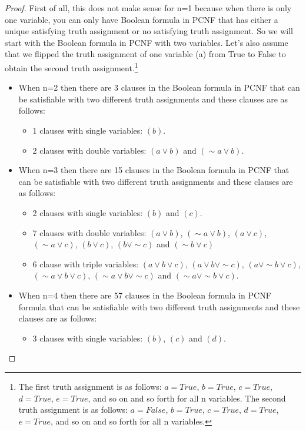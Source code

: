 \documentclass[runningheads,a4paper]{llncs}
\let\oldsim\sim
\renewcommand{\sim}{{\oldsim}}
\begin{document}
\begin{theorem}
\begin{proof}
First of all, this does not make sense for n=1 because when there is only one variable, you can only have Boolean formula in PCNF that has either a unique satisfying truth assignment or no satisfying truth assignment. So we will start with the Boolean formula in PCNF with two variables. Let's also assume that we flipped the truth assignment of one variable (a) from True to False to obtain the second truth assignment.\footnote{The first truth assignment is as follows: $a=True$, $b=True$, $c=True$, $d=True$, $e=True$, and so on and so forth for all n variables. The second truth assignment is as follows: $a=False$, $b=True$, $c=True$, $d=True$, $e=True$, and so on and so forth for all n variables. } 
\begin{itemize}
\item When n=2 then there are 3 clauses in the Boolean formula in PCNF that can be satisfiable with two different truth assignments  and these clauses are as follows:
    \begin{itemize}
    \item 1 clauses with single variables: $(b)$.
    \item 2 clauses with double variables: $({a}\vee {b})$ and $(\sim {a}\vee {b})$.
    \end{itemize}
\item When n=3 then there are 15 clauses in the Boolean formula in PCNF that can be satisfiable with two different truth assignments and these clauses are as follows:
    \begin{itemize}
    \item 2 clauses with single variables:  $(b)$ and $(c)$.
    \item 7 clauses with double variables: $({a}\vee {b})$,  $(\sim {a}\vee {b})$,  $({a}\vee {c})$, $(\sim {a}\vee {c})$,  $({b}\vee {c})$, $({b}\vee \sim {c})$ and $(\sim {b}\vee {c})$
    \item 6 clause with triple variables: $({a}\vee {b} \vee {c})$, $({a}\vee {b} \vee \sim {c})$, $({a}\vee \sim {b} \vee {c})$, $(\sim {a}\vee {b} \vee {c})$, $(\sim {a}\vee {b} \vee \sim {c})$ and $( \sim {a}\vee \sim {b} \vee {c})$.
    \end{itemize}
\item When n=4 then there are 57 clauses in the Boolean formula in PCNF formula that can be satisfiable with two different truth assignments and these clauses are as follows:
    \begin{itemize}
    \item 3 clauses with single variables:  $(b)$, $(c)$ and $(d)$.

\end{itemize}
\end{itemize}
\end{proof}
\end{theorem}
\end{document}
